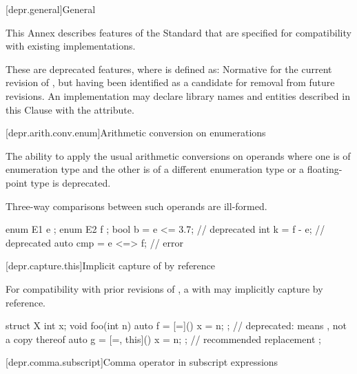 
\newcommand{\requires}{\Fundesc{Requires}}

[depr.general]{General}

\pnum
This Annex describes features of the \Cpp{} Standard that are specified for compatibility with
existing implementations.

\pnum
These are deprecated features, where
is defined as:
Normative for the current revision of \Cpp{},
but having been identified as a candidate for removal from future revisions.
An implementation may declare library names and entities described in this Clause with the
 attribute.

[depr.arith.conv.enum]{Arithmetic conversion on enumerations}

\pnum
The ability to apply the usual arithmetic conversions
on operands where one is of enumeration type
and the other is of a different enumeration type
or a floating-point type
is deprecated.
\begin{note}
Three-way comparisons between such operands are ill-formed.
\end{note}
\begin{example}
\begin{codeblock}
enum E1 { e };
enum E2 { f };
bool b = e <= 3.7;              // deprecated
int k = f - e;                  // deprecated
auto cmp = e <=> f;             // error
\end{codeblock}
\end{example}

[depr.capture.this]{Implicit capture of  by reference}

\pnum
For compatibility with prior revisions of \Cpp{},
a  with 
\tcode{=} may implicitly capture
 by reference.
\begin{example}
\begin{codeblock}
struct X {
  int x;
  void foo(int n) {
    auto f = [=]() { x = n; };          // deprecated:  means , not a copy thereof
    auto g = [=, this]() { x = n; };    // recommended replacement
  }
};
\end{codeblock}
\end{example}

[depr.comma.subscript]{Comma operator in subscript expressions}

